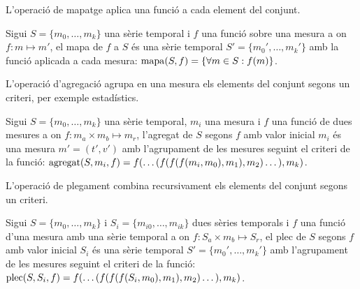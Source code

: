 L'operació de mapatge aplica una funció a cada element del conjunt.
\begin{definition}[mapa]
  Sigui $S=\{m_0, \dotsc, m_k\}$ una sèrie temporal i $f$ una funció
  sobre una mesura a on $f:m\mapsto m'$, el mapa de $f$ a $S$ és una
  sèrie temporal $S'=\{m_0', \dotsc, m_k'\}$ amb la funció aplicada a
  cada mesura: $\operatorname*{mapa}(S,f) = \{\forall m\in S : f(m) \}$.
\end{definition}


L'operació d'agregació agrupa en una mesura els elements del conjunt
segons un criteri, per exemple estadístics.
\begin{definition}[agregat]
  Sigui $S=\{m_0, \dotsc, m_k\}$ una sèrie temporal, $m_i$ una mesura
  i $f$ una funció de dues mesures a on $f: m_a \times m_b \mapsto
  m_r$, l'agregat de $S$ segons $f$ amb valor inicial $m_i$ és una
  mesura $m' = (t',v')$ amb l'agrupament de les mesures seguint el
  criteri de la funció: $\operatorname*{agregat}(S,m_i,f) = f(\dots(
  f(f(f(m_i,m_0),m_1),\allowbreak m_2 )\dots),\allowbreak m_k)$.
\end{definition}



L'operació de plegament combina recursivament els elements del conjunt
segons un criteri.
\begin{definition}[plec]
  Sigui $S=\{m_0, \dotsc, m_k\}$ i $S_i=\{m_{i0}, \dotsc, m_{ik}\}$
  dues sèries temporals i $f$ una funció d'una mesura amb una sèrie
  temporal a on $f: S_a \times m_b \mapsto S_r$, el plec de $S$ segons
  $f$ amb valor inicial $S_i$ és una sèrie temporal $S'= \{m_0',
  \dotsc, m_k'\}$ amb l'agrupament de les mesures seguint el criteri
  de la funció: $\operatorname*{plec}(S,S_i,f) = f(\dots(
  f(f(f(S_i,m_0),m_1),\allowbreak m_2 )\dots),\allowbreak m_k)$.
\end{definition}


